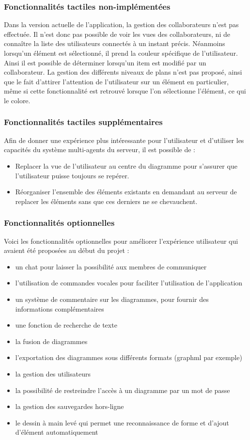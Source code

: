 \subsubsection{Fonctionnalités tactiles non-implémentées}
Dans la version actuelle de l'application, la gestion des collaborateurs n'est pas effectuée.
Il n'est donc pas possible de voir les vues des collaborateurs, ni de connaître la liste des utilisateurs connectés à un instant précis.
Néanmoins lorsqu'un élément est sélectionné, il prend la couleur spécifique de l'utilisateur.
Ainsi il est possible de déterminer lorsqu'un item est modifié par un collaborateur. 
La gestion des différents niveaux de plans n'est pas proposé, ainsi que le fait d'attirer l'attention de l'utilisateur sur un élément en particulier, même si cette fonctionnalité est retrouvé lorsque l'on sélectionne l'élément, ce qui le colore. 

\subsubsection{Fonctionnalités tactiles supplémentaires}
Afin de donner une expérience plus intéressante pour l'utilisateur et d'utiliser les capacités du système multi-agents du serveur, il est possible de :
\begin{itemize}
	\item Replacer la vue de l'utilisateur au centre du diagramme pour s'assurer que l'utilisateur puisse toujours se repérer.
	\item Réorganiser l'ensemble des éléments existants en demandant au serveur de replacer les éléments sans que ces derniers ne se chevauchent.
\end{itemize}

\subsubsection{Fonctionnalités optionnelles}
Voici les fonctionnalités optionnelles pour améliorer l'expérience utilisateur qui avaient été proposées au début du projet :
\begin{itemize}
\item un chat pour laisser la possibilité aux membres de communiquer
\item l'utilisation de commandes vocales pour faciliter l'utilisation de l'application
\item un système de commentaire sur les diagrammes, pour fournir des informations complémentaires
\item une fonction de recherche de texte
\item la fusion de diagrammes
\item l'exportation des diagrammes sous différents formats (graphml par exemple)
\item la gestion des utilisateurs
\item la possibilité de restreindre l'accès à un diagramme par un mot de passe
\item la gestion des sauvegardes hors-ligne
\item le dessin à main levé qui permet une reconnaissance de forme et d'ajout d'élément automatiquement
\end{itemize}

